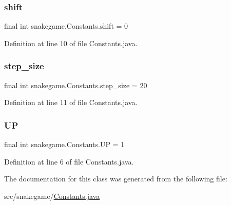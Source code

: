 \subsubsection{\texorpdfstring{shift}{shift}}
{\footnotesize\ttfamily final int snakegame.\+Constants.\+shift = 0\hspace{0.3cm}{\ttfamily [static]}}



Definition at line 10 of file Constants.\+java.

\mbox{\label{classsnakegame_1_1_constants_a3c24c7aa6b732df3fd18eaf1394f9255}} 
\subsubsection{\texorpdfstring{step\+\_\+size}{step\_size}}
{\footnotesize\ttfamily final int snakegame.\+Constants.\+step\+\_\+size = 20\hspace{0.3cm}{\ttfamily [static]}}



Definition at line 11 of file Constants.\+java.

\mbox{\label{classsnakegame_1_1_constants_a47ff3bd3c0ecae5e9f2b878915a9dad2}} 
\subsubsection{\texorpdfstring{UP}{UP}}
{\footnotesize\ttfamily final int snakegame.\+Constants.\+UP = 1\hspace{0.3cm}{\ttfamily [static]}}



Definition at line 6 of file Constants.\+java.



The documentation for this class was generated from the following file\+:\begin{DoxyCompactItemize}
\item 
src/snakegame/\mbox{\hyperlink{_constants_8java}{Constants.\+java}}\end{DoxyCompactItemize}
